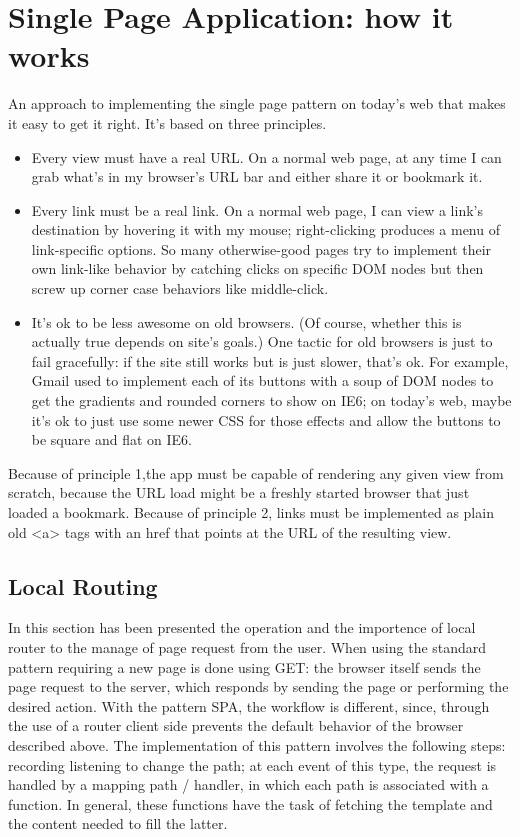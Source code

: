 \section{Single Page Application: how it works}
\label{sec:ARC_function}

An approach to implementing the single page pattern on today's web that makes it easy to get it right. It's based on three principles.
\begin{itemize}
\item Every view must have a real URL. On a normal web page, at any time I can grab what's in my browser's URL bar and either share it or bookmark it.
\item Every link must be a real link. On a normal web page, I can view a link's destination by hovering it with my mouse; right-clicking produces a menu of link-specific options. So many otherwise-good pages try to implement their own link-like behavior by catching clicks on specific DOM nodes but then screw up corner case behaviors like middle-click.
\item It's ok to be less awesome on old browsers. (Of course, whether this is actually true depends on site's goals.) One tactic for old browsers is just to fail gracefully: if the site still works but is just slower, that's ok. For example, Gmail used to implement each of its buttons with a soup of DOM nodes to get the gradients and rounded corners to show on IE6; on today's web, maybe it's ok to just use some newer CSS for those effects and allow the buttons to be square and flat on IE6.
\end{itemize}

Because of principle 1,the  app must be capable of rendering any given view from scratch, because the URL load might be a freshly started browser that just loaded a bookmark. Because of principle 2, links must be implemented as plain old <a> tags with an href that points at the URL of the resulting view.
\cite{arc_tech}

\subsection{Local Routing}

In this section has been presented the operation and the importence of local router to the manage of page request from the user.
When using the standard pattern requiring a new page is done using GET: the browser itself sends the page request to the server, which responds by sending the page or performing the desired action.
With the pattern SPA, the workflow is different, since, through the use of a router client side prevents the default behavior of the browser described above.
The implementation of this pattern involves the following steps: recording listening to change the path; at each event of this type, the request is handled by a mapping path / handler, in which each path is associated with a function. In general, these functions have the task of fetching the template and the content needed to fill the latter.

